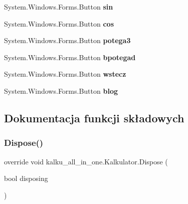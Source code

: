 \begin{DoxyCompactItemize}
\mbox{\label{classkalku__all__in__one_1_1_kalkulator_ae04e589440ef380f40d2cb7024c63e35}} 
System.\+Windows.\+Forms.\+Button {\bfseries sin}
\item 
\mbox{\label{classkalku__all__in__one_1_1_kalkulator_acd787e6a8443a6154ad732a104c2dbb8}} 
System.\+Windows.\+Forms.\+Button {\bfseries cos}
\item 
\mbox{\label{classkalku__all__in__one_1_1_kalkulator_a58b08fda15a4963086c8863fef3a0a99}} 
System.\+Windows.\+Forms.\+Button {\bfseries potega3}
\item 
\mbox{\label{classkalku__all__in__one_1_1_kalkulator_a3ecfec0844d6514208cb5a1548c1a80e}} 
System.\+Windows.\+Forms.\+Button {\bfseries bpotegad}
\item 
\mbox{\label{classkalku__all__in__one_1_1_kalkulator_add43d17e60665ba44688c94449e3792a}} 
System.\+Windows.\+Forms.\+Button {\bfseries wstecz}
\item 
\mbox{\label{classkalku__all__in__one_1_1_kalkulator_ac29517d0195803ca9a1f3b1d13d0ecde}} 
System.\+Windows.\+Forms.\+Button {\bfseries blog}
\end{DoxyCompactItemize}


\subsection{Dokumentacja funkcji składowych}
\mbox{\label{classkalku__all__in__one_1_1_kalkulator_a36b8f80b3fb28e7f3aed0b3a87374a17}} 
\subsubsection{\texorpdfstring{Dispose()}{Dispose()}}
{\footnotesize\ttfamily override void kalku\+\_\+all\+\_\+in\+\_\+one.\+Kalkulator.\+Dispose (\begin{DoxyParamCaption}\item[{bool}]{disposing }\end{DoxyParamCaption})\hspace{0.3cm}{\ttfamily [protected]}}



